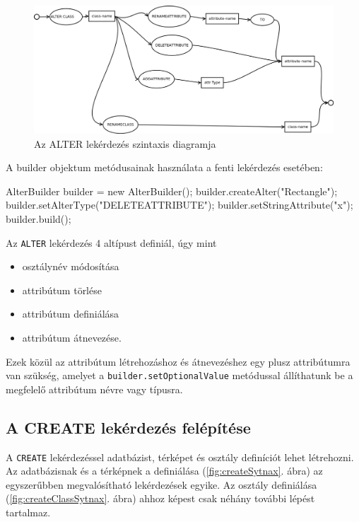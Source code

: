 \begin{figure}[htb]
	\begin{center}
		\includegraphics[scale=0.4]{images/alter}
		\caption{Az ALTER lekérdezés szintaxis diagramja}
		\label{fig:alterSytnax}
	\end{center}
\end{figure}

A builder objektum metódusainak használata a fenti lekérdezés esetében:

\begin{java}
AlterBuilder builder = new AlterBuilder();
builder.createAlter("Rectangle");
builder.setAlterType("DELETEATTRIBUTE");
builder.setStringAttribute("x");
builder.build();
\end{java}

Az \texttt{ALTER} lekérdezés 4 altípust definiál, úgy mint

\begin{itemize}
\item osztálynév módosítása
\item attribútum törlése
\item attribútum definiálása
\item attribútum átnevezése.
\end{itemize}

Ezek közül az attribútum létrehozáshoz és átnevezéshez egy plusz attribútumra van szükség, amelyet a \texttt{builder.setOptionalValue} metódussal állíthatunk be a megfelelő attribútum névre vagy típusra.

\subsection{A CREATE lekérdezés felépítése}

A \texttt{CREATE} lekérdezéssel adatbázist, térképet és osztály definíciót lehet létrehozni. Az adatbázisnak és a térképnek a definiálása (\ref{fig:createSytnax}. ábra) az egyszerűbben megvalósítható lekérdezések egyike. Az osztály definiálása (\ref{fig:createClassSytnax}. ábra) ahhoz képest csak néhány további lépést tartalmaz.

